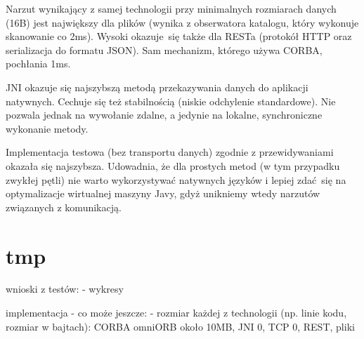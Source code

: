 \begin{figure}[H]
\caption{}
\label{fig:chart_134217728_134217728}
\end{figure}

Narzut wynikający z samej technologii przy minimalnych rozmiarach danych (16B) jest największy dla plików (wynika z obserwatora katalogu, który wykonuje skanowanie co 2ms). Wysoki okazuje się także dla RESTa (protokół HTTP oraz serializacja do formatu JSON). Sam mechanizm, którego używa CORBA, pochłania 1ms.


JNI okazuje się najszybszą metodą przekazywania danych do aplikacji natywnych. Cechuje się też stabilnością (niskie odchylenie standardowe). Nie pozwala jednak na wywołanie zdalne, a jedynie na lokalne, synchroniczne wykonanie metody.




Implementacja testowa (bez transportu danych) zgodnie z przewidywaniami okazała się najszybsza. Udowadnia, że dla prostych metod (w tym przypadku zwykłej pętli) nie warto wykorzystywać natywnych języków i lepiej zdać się na optymalizacje wirtualnej maszyny Javy, gdyż unikniemy wtedy narzutów związanych z komunikacją.


\section{tmp}

wnioski z testów:
- wykresy

implementacja - co może jeszcze:
- rozmiar każdej z technologii (np. linie kodu, rozmiar w bajtach): CORBA omniORB około 10MB, JNI 0, TCP 0, REST, pliki
